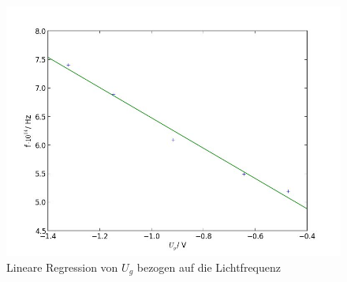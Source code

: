 	\begin{figure}[h]
		\begin{center}
		\includegraphics[scale=0.7]{picblinreg1.jpg}
		\caption{Lineare Regression von $U_g$ bezogen auf die Lichtfrequenz}
		\label{picblinreg1}
		\end{center}	
	\end{figure}